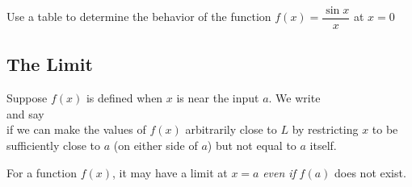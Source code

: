 \documentclass[notes]{subfiles}
\begin{document}
		\begin{ex}
			Use a table to determine the behavior of the function \(f(x) = \dfrac{\sin x}{x}\) at \(x=0\)
		\end{ex}
			
	\subsection*{The Limit}
		\begin{defn}
			Suppose \(f(x)\) is defined when \(x\) is near the input \(a\).  We write\\[50pt]
			and say\\[75pt]
			if we can make the values of \(f(x)\) arbitrarily close to \(L\) by restricting \(x\) to be sufficiently close to \(a\) (on either side of \(a\)) but not equal to \(a\) itself.
		\end{defn}
		
		\begin{rmk}
			For a function \(f(x)\), it may have a limit at \(x=a\) \emph{even if} \(f(a)\) does not exist.
		\end{rmk}
			\newpage
			
\end{document}
